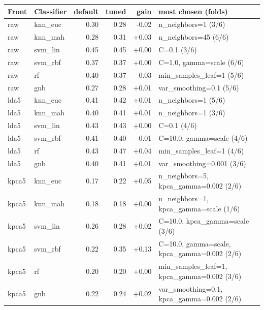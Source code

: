 \begin{tabular}{llrrrl}
\toprule
Front & Classifier & default & tuned & gain & most chosen (folds) \\
\midrule
raw & knn\_euc & 0.30 & 0.28 & -0.02 & n\_neighbors=1 (3/6) \\
raw & knn\_mah & 0.28 & 0.31 & +0.03 & n\_neighbors=45 (6/6) \\
raw & svm\_lin & 0.45 & 0.45 & +0.00 & C=0.1 (3/6) \\
raw & svm\_rbf & 0.37 & 0.37 & +0.00 & C=1.0, gamma=scale (6/6) \\
raw & rf & 0.40 & 0.37 & -0.03 & min\_samples\_leaf=1 (5/6) \\
raw & gnb & 0.27 & 0.28 & +0.01 & var\_smoothing=0.1 (5/6) \\
lda5 & knn\_euc & 0.41 & 0.42 & +0.01 & n\_neighbors=1 (5/6) \\
lda5 & knn\_mah & 0.40 & 0.41 & +0.01 & n\_neighbors=1 (3/6) \\
lda5 & svm\_lin & 0.43 & 0.43 & +0.00 & C=0.1 (4/6) \\
lda5 & svm\_rbf & 0.41 & 0.40 & -0.01 & C=10.0, gamma=scale (4/6) \\
lda5 & rf & 0.43 & 0.47 & +0.04 & min\_samples\_leaf=1 (4/6) \\
lda5 & gnb & 0.40 & 0.41 & +0.01 & var\_smoothing=0.001 (3/6) \\
kpca5 & knn\_euc & 0.17 & 0.22 & +0.05 & n\_neighbors=5, kpca\_gamma=0.002 (2/6) \\
kpca5 & knn\_mah & 0.18 & 0.18 & +0.00 & n\_neighbors=1, kpca\_gamma=scale (1/6) \\
kpca5 & svm\_lin & 0.26 & 0.28 & +0.02 & C=10.0, kpca\_gamma=scale (3/6) \\
kpca5 & svm\_rbf & 0.22 & 0.35 & +0.13 & C=10.0, gamma=scale, kpca\_gamma=0.002 (2/6) \\
kpca5 & rf & 0.20 & 0.20 & +0.00 & min\_samples\_leaf=1, kpca\_gamma=0.002 (3/6) \\
kpca5 & gnb & 0.22 & 0.24 & +0.02 & var\_smoothing=0.1, kpca\_gamma=0.002 (2/6) \\
\bottomrule
\end{tabular}
